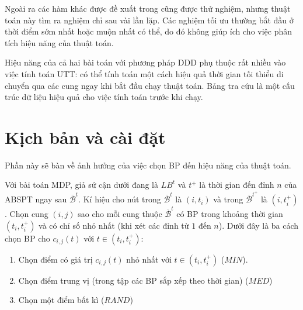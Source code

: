 \documentclass[../main.tex]{subfiles}
\begin{document}

Ngoài ra các hàm khác được đề xuất trong \cite{figliozzi2012time} cũng
được thử nghiệm, nhưng thuật toán này tìm ra nghiệm chỉ sau vài lần lặp.
Các nghiệm tối ưu thường bắt đầu ở thời điểm sớm nhất hoặc muộn nhất có
thể, do đó không giúp ích cho việc phân tích hiệu năng của thuật toán.

Hiệu năng của cả hai bài toán với phương pháp DDD phụ thuộc rất nhiều
vào việc tính toán UTT: có thể tính toán một cách hiệu quả thời gian tối
thiểu di chuyển qua các cung ngay khi bắt đầu chạy thuật toán. Bảng tra
cứu là một cấu trúc dữ liệu hiệu quả cho việc tính toán trước khi chạy.

\section{Kịch bản và cài
đặt}\label{kux1ecbch-bux1ea3n-vuxe0-cuxe0i-ux111ux1eb7t}

Phần này sẽ bàn về ảnh hưởng của việc chọn BP đến hiệu năng của
thuật toán.

Với bài toán MDP, giả sử cận dưới đang là \(LB^t\) và \(t^+\) là thời
gian đến đỉnh \(n\) của ABSPT ngay sau \(\overline{\mathcal{B}}^t\). Kí
hiệu cho nút trong \(\overline{\mathcal{B}}^t\) là \((i,t_i)\) và trong
\(\overline{\mathcal{B}}^{t^+}\) là \((i, t_i^+)\). Chọn cung \((i,j)\)
sao cho mỗi cung thuộc \(\overline{\mathcal{B}}^{t}\) có BP trong
khoảng thời gian \((t_i, t_i^+)\) và có chỉ số nhỏ nhất (khi xét các
đỉnh từ \(1\) đến \(n\)). Dưới đây là ba cách chọn BP cho
\(c_{i,j}(t)\) với \(t\in (t_i, t_i^+)\):

\begin{enumerate}
\def\labelenumi{\arabic{enumi}.}
\tightlist
\item
  Chọn điểm có giá trị \(c_{i, j}(t)\) nhỏ nhất với
  \(t\in (t_i, t_i^+)\) (\(MIN\)).
\item
  Chọn điểm trung vị (trong tập các BP sắp xếp theo thời gian)
  (\(MED\))
\item
  Chọn một điểm bất kì (\(RAND\))
\end{enumerate}


\end{document}
